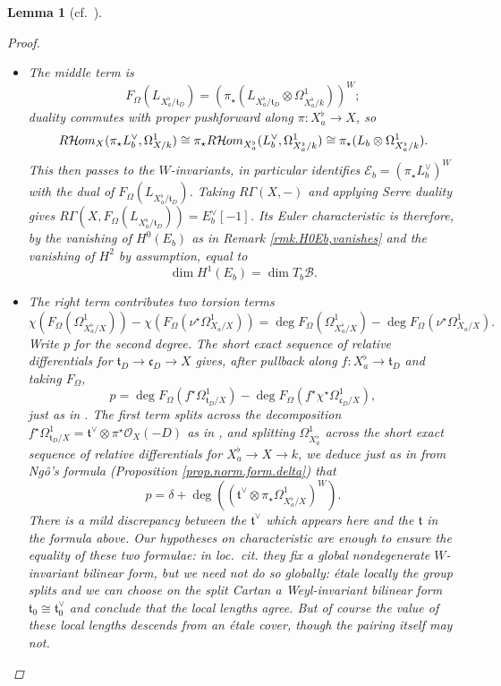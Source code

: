 \documentclass[openany]{amsbook}
\newtheorem{lemma}[theorem]{Lemma}
\theoremstyle{definition}
\theoremstyle{remark}
\numberwithin{equation}{section}
\renewcommand{\O}{\mathcal{O}}
\newcommand{\cE}{\mathcal{E}}
\newcommand{\cB}{\mathcal{B}}
\renewcommand{\-}{\operatorname{-}}
\newcommand{\sHom}{\mathcal{H}\kern -.5pt om}
\newcommand{\RsHom}{R\sHom}
\newcommand{\ft}{\mathfrak{t}}
\newcommand{\fc}{\mathfrak{c}}
\begin{document}
\begin{lemma}[{cf.\ \cite[Lemme 9.9.1]{CLII}}]
\begin{proof}
\begin{itemize}
            \item The middle term is
            $$
                F_\Omega(L_{X_a^\flat/\ft_D}) = (\pi_\star(L_{X_a^\flat/\ft_D} \otimes \Omega^1_{X_a^\flat/k}))^W;
            $$
            duality commutes with proper pushforward along $\pi : X_a^{\flat} \to X$, so
            $$
                \RsHom_X(\pi_\star L_b^\vee, \Omega^1_{X/k}) \cong \pi_\star \RsHom_{X_a^\flat}(L_b^\vee, \Omega^1_{X_a^\flat/k}) \cong \pi_\star(L_b \otimes \Omega^1_{X_a^\flat/k}).
            $$
            This then passes to the $W$-invariants, in particular identifies $\cE_b = (\pi_\star L_b^\vee)^W$ with the dual of $F_\Omega(L_{X_a^\flat/\ft_D})$. Taking $R\Gamma(X, -)$ and applying Serre duality gives $R\Gamma(X, F_{\Omega}(L_{X_a^\flat/\ft_D})) = E_b^\vee[-1]$. Its Euler characteristic is therefore, by the vanishing of $H^0(E_b)$ as in Remark \ref{rmk.H0Eb,vanishes} and the vanishing of $H^2$ by assumption, equal to 
            $$
                \dim H^1(E_b) = \dim T_b \cB.
            $$

            \item The right term contributes two torsion terms
            $$
                 \chi(F_\Omega(\Omega^1_{X_a^\flat/X})) - \chi(F_\Omega(\nu^\star \Omega^1_{X_a/X})) = \deg F_\Omega(\Omega^1_{X_a^\flat/X})-\deg F_\Omega(\nu^\star \Omega^1_{X_a/X}).
            $$
            Write $p$ for the second degree. The short exact sequence of relative differentials for $\ft_D \to \fc_D \to X$ gives, after pullback along $f : X_a^\flat \to \ft_D$ and taking $F_\Omega$,
            $$
                p = \deg F_{\Omega}(f^\star \Omega^1_{\ft_D/X}) - \deg F_\Omega(f^\star \chi^\star \Omega^1_{\fc_D/X}),
            $$
            just as in \cite[Lemme 9.10.2]{CLII}. The first term splits across the decomposition $f^\star \Omega^1_{\ft_D/X} = \ft^\vee \otimes \pi^\star \O_X(-D)$ as in \cite[Lemme 9.10.3]{CLII}, and splitting $\Omega^1_{X_a^\flat}$ across the short exact sequence of relative differentials for $X_a^\flat \to X \to k$, we deduce just as in \cite[Lemme 9.10.4]{CLII} from Ng\^{o}'s formula (Proposition  \ref{prop.norm.form.delta}) that
            $$
                p = \delta + \deg((\ft^\vee \otimes \pi_\star \Omega^1_{X^\flat_a/X})^W).
            $$
            There is a mild discrepancy between the $\ft^\vee$ which appears here and the $\ft$ in the formula above. Our hypotheses on characteristic are enough to ensure the equality of these two formulae: in \textit{loc.\ cit.} they fix a global nondegenerate $W$-invariant bilinear form, but we need not do so globally: \'etale locally the group splits and we can choose on the split Cartan a Weyl-invariant bilinear form $\ft_0 \cong \ft_0^\vee$ and conclude that the local lengths agree. But of course the value of these local lengths descends from an \'etale cover, though the pairing itself may not.
            

\end{itemize}
\end{proof}
\end{lemma}
\end{document}
